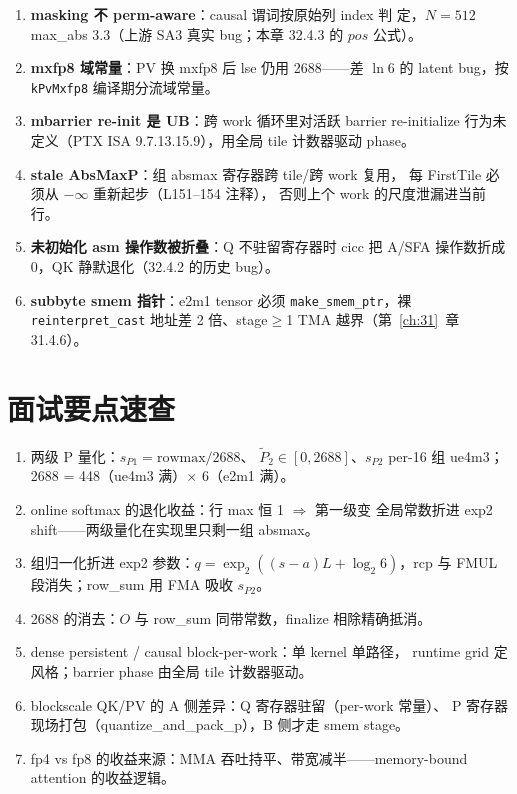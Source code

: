 \begin{enumerate}[itemsep=2pt,topsep=2pt]
  \item \textbf{masking 不 perm-aware}：causal 谓词按原始列 index 判
        定，$N{=}512$ max\_abs 3.3（上游 SA3 真实 bug；本章 32.4.3 的
        $pos$ 公式）。
  \item \textbf{mxfp8 域常量}：PV 换 mxfp8 后 lse 仍用 2688——差
        $\ln6$ 的 latent bug，按 \texttt{kPvMxfp8} 编译期分流域常量。
  \item \textbf{mbarrier re-init 是 UB}：跨 work 循环里对活跃 barrier
        re-initialize 行为未定义（PTX ISA 9.7.13.15.9），用全局 tile
        计数器驱动 phase。
  \item \textbf{stale AbsMaxP}：组 absmax 寄存器跨 tile/跨 work 复用，
        每 FirstTile 必须从 $-\infty$ 重新起步（L151--154 注释），
        否则上个 work 的尺度泄漏进当前行。
  \item \textbf{未初始化 asm 操作数被折叠}：Q 不驻留寄存器时 cicc 把
        A/SFA 操作数折成 0，QK 静默退化（32.4.2 的历史 bug）。
  \item \textbf{subbyte smem 指针}：e2m1 tensor 必须
        \texttt{make\_smem\_ptr}，裸 \texttt{reinterpret\_cast} 地址差
        2 倍、stage$\ge$1 TMA 越界（第~\ref{ch:31}~章 31.4.6）。
\end{enumerate}

\section{面试要点速查}

\begin{enumerate}[itemsep=2pt,topsep=2pt]
  \item 两级 P 量化：$s_{P1}=\mathrm{rowmax}/2688$、
        $\tilde P_2\in[0,2688]$、$s_{P2}$ per-16 组 ue4m3；2688 =
        448（ue4m3 满）$\times$ 6（e2m1 满）。
  \item online softmax 的退化收益：行 max 恒 1 $\Rightarrow$ 第一级变
        全局常数折进 exp2 shift——两级量化在实现里只剩一组 absmax。
  \item 组归一化折进 exp2 参数：$q=\exp_2((s-a)L+\log_2 6)$，rcp 与
        FMUL 段消失；row\_sum 用 FMA 吸收 $s_{P2}$。
  \item 2688 的消去：$O$ 与 row\_sum 同带常数，finalize 相除精确抵消。
  \item dense persistent / causal block-per-work：单 kernel 单路径，
        runtime grid 定风格；barrier phase 由全局 tile 计数器驱动。
  \item blockscale QK/PV 的 A 侧差异：Q 寄存器驻留（per-work 常量）、
        P 寄存器现场打包（quantize\_and\_pack\_p），B 侧才走 smem
        stage。
  \item fp4 vs fp8 的收益来源：MMA 吞吐持平、带宽减半——memory-bound
        attention 的收益逻辑。
\end{enumerate}

